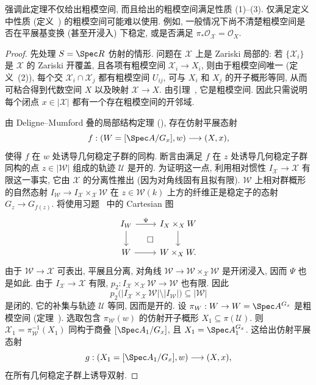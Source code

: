 \begin{remark}\label{src:5.4.8}
强调此定理不仅给出粗模空间, 而且给出的粗模空间满足性质 (1)--(3). 仅满足定义中性质 (定义~) 的粗模空间可能难以使用. 例如, 一般情况下尚不清楚粗模空间是否在平展基变换 (甚至开浸入) 下稳定, 或是否满足 $\pi_*\mathcal O_{\mathcal X}=\mathcal O_X$.
\end{remark}
\begin{proof}
先处理 $S=\Spec R$ 仿射的情形. 问题在 $\mathcal X$ 上是 Zariski 局部的: 若 $\{\mathcal X_i\}$ 是 $\mathcal X$ 的 Zariski 开覆盖, 且各项有粗模空间 $\mathcal X_i\to X_i$, 则由于粗模空间唯一 (定义~(2)), 每个交 $\mathcal X_i\cap\mathcal X_j$ 都有粗模空间 $U_{ij}$, 可与 $X_i$ 和 $X_j$ 的开子概形等同, 从而可粘合得到代数空间 $X$ 以及映射 $\mathcal X\to X$. 由引理~, 它是粗模空间. 因此只需说明每个闭点 $x\in|\mathcal X|$ 都有一个存在粗模空间的开邻域.

由 Deligne--Mumford 叠的局部结构定理 (), 存在仿射平展态射
\[
f:(\mathcal W=[\Spec A/G_x],w)\longrightarrow(\mathcal X,x),
\]
使得 $f$ 在 $w$ 处诱导几何稳定子群的同构. 断言由满足 $f$ 在 $z$ 处诱导几何稳定子群同构的点 $z\in|\mathcal W|$ 组成的轨迹 $\mathcal U$ 是开的. 为证明这一点, 利用相对惯性 $I_{\mathcal X}\to\mathcal X$ 有限这一事实, 它由 $\mathcal X$ 的分离性推出 (因为对角线固有且拟有限). $\mathcal W$ 上相对群概形的自然态射 $I_{\mathcal W}\to I_{\mathcal X}\times_{\mathcal X}\mathcal W$ 在 $z\in\mathcal W(k)$ 上方的纤维正是稳定子的态射 $G_z\to G_{f(z)}$. 将使用习题~ 中的 Cartesian 图
\[
\begin{tikzcd}
I_{\mathcal W}\arrow[r,"\Psi"]\arrow[d]&I_{\mathcal X}\times_{\mathcal X}\mathcal W\arrow[d]\\
\mathcal W\arrow[r]\arrow[ur,phantom,"\square" description]&\mathcal W\times_{\mathcal X}\mathcal W.
\end{tikzcd}
\]
由于 $\mathcal W\to\mathcal X$ 可表出, 平展且分离, 对角线 $\mathcal W\to\mathcal W\times_{\mathcal X}\mathcal W$ 是开闭浸入, 因而 $\Psi$ 也是如此. 由于 $I_{\mathcal X}\to\mathcal X$ 有限, $p_2:I_{\mathcal X}\times_{\mathcal X}\mathcal W\to\mathcal W$ 也有限. 因此
\[
p_2\bigl(|I_{\mathcal X}\times_{\mathcal X}\mathcal W|\setminus|I_{\mathcal W}|\bigr)\subseteq|\mathcal W|
\]
是闭的, 它的补集与轨迹 $\mathcal U$ 等同, 因而是开的. 设 $\pi_{\mathcal W}:\mathcal W\to W=\Spec A^{G_x}$ 是粗模空间 (定理~). 选取包含 $\pi_{\mathcal W}(w)$ 的仿射开子概形 $X_1\subseteq\pi(\mathcal U)$. 则 $\mathcal X_1=\pi_{\mathcal W}^{-1}(X_1)$ 同构于商叠 $[\Spec A_1/G_x]$, 且 $X_1=\Spec A_1^{G_x}$. 这给出仿射平展态射
\[
g:(\mathcal X_1=[\Spec A_1/G_x],w)\longrightarrow(\mathcal X,x),
\]
在所有几何稳定子群上诱导双射.


\end{proof}
